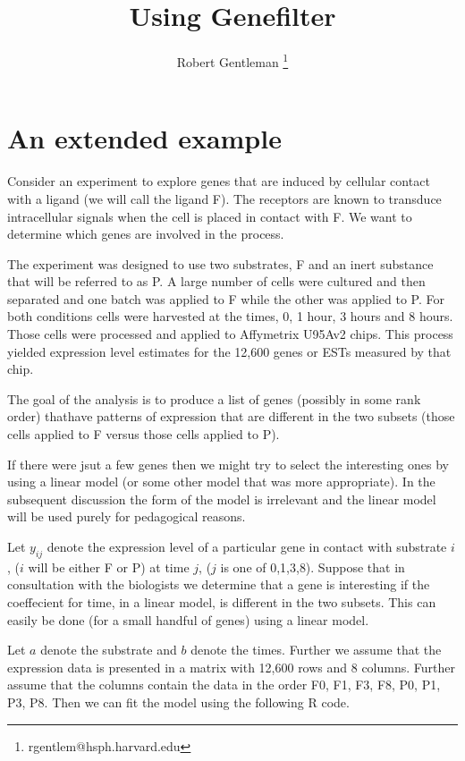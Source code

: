 \documentclass{article}
\begin{document}
\title{Using Genefilter}
\author{Robert Gentleman \thanks{rgentlem@hsph.harvard.edu}
}
\date{}
\maketitle

\section{An extended example}

Consider an experiment to explore genes that are induced by cellular
contact with a ligand (we will call the ligand F).
The receptors are known to transduce intracellular signals when the
cell is placed in contact with F. We want to determine which genes are
involved in the process.

The experiment was designed to use two substrates, F and an inert
substance that will be referred to as P.
A large number of cells were cultured and then separated and one batch
was applied to F while the other was applied to P.
For both conditions cells were harvested at the times, 0, 1 hour, 3
hours and 8 hours. Those cells were processed and applied to
Affymetrix U95Av2 chips. This process yielded expression level
estimates for the 12,600 genes or ESTs measured by that chip.

The goal of the analysis is to produce a list of genes (possibly in
some rank order) thathave patterns of expression that are different in
the two subsets (those cells applied to F versus those cells applied
to P).

If there were jsut a few genes then we might try to select the
interesting ones by using a linear model (or some other model that was
more appropriate). In the subsequent discussion the form of the model
is irrelevant and the linear model will be used purely for pedagogical
reasons.

Let $y_{ij}$ denote the expression level of a particular gene in
contact with substrate $i$, ($i$ will be either F or P) at time $j$,
($j$ is one of 0,1,3,8).
Suppose that in consultation with the biologists we determine that a
gene is interesting if the coeffecient for time, in a linear model, is
different in the two subsets.
This can easily be done (for a small handful of genes) using a linear
model. 

Let $a$ denote the substrate and $b$ denote the times. Further we
assume that the expression data is presented in a matrix with 12,600
rows and 8 columns. Further assume that the columns contain the data
in the order F0, F1, F3, F8, P0, P1, P3, P8.
Then we can fit the model using the following R code.
\end{document}

